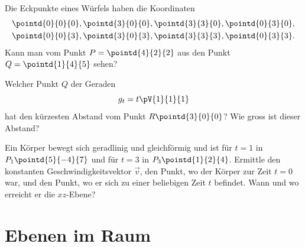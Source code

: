 \documentclass[%
11pt,%
twoside,%
titlepage,%
german,%
headsepline%
]{scrartcl}
\theoremstyle{definition}
\theoremstyle{plain}
\begin{document}
\begin{ueb}
Die Eckpunkte eines Würfels haben die Koordinaten
\begin{align*}
\pointd{0}{0}{0}, \pointd{3}{0}{0}, \pointd{3}{3}{0}, \pointd{0}{3}{0},\\
\pointd{0}{0}{3}, \pointd{3}{0}{3}, \pointd{3}{3}{3}, \pointd{0}{3}{3}.
\end{align*}
Kann man vom Punkt $P=\pointd{4}{2}{2}$ aus den Punkt $Q=\pointd{1}{4}{5}$ sehen?
\end{ueb}

\begin{ueb}[Abstand]
Welcher Punkt $Q$ der Geraden
$$g_t=t\pV{1}{1}{1}$$
hat den kürzesten Abstand vom Punkt $R\pointd{3}{0}{0}$? Wie gross ist dieser Abstand?
\end{ueb}

\begin{ueb}
Ein Körper bewegt sich geradlinig und gleichförmig und ist für $t = 1$ in $P_1\pointd{5}{-4}{7}$ und für $t = 3$ in $P_3\pointd{1}{2}{4}$. Ermittle den konstanten Ge\-schwin\-dig\-keits\-vektor $\vec{v}$, den Punkt, wo der Körper zur Zeit $t = 0$ war, und den Punkt, wo er sich zu einer beliebigen Zeit $t$ befindet. Wann und wo erreicht er die $xz$-Ebene?
\end{ueb}

\section{Ebenen im Raum}
\end{document}
